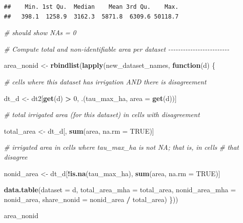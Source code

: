 \documentclass[
  11pt,
]{article}
\newenvironment{Shaded}{\begin{snugshade}}{\end{snugshade}}
\newcommand{\AttributeTok}[1]{\textcolor[rgb]{0.13,0.29,0.53}{#1}}
\newcommand{\CommentTok}[1]{\textcolor[rgb]{0.56,0.35,0.01}{\textit{#1}}}
\newcommand{\ConstantTok}[1]{\textcolor[rgb]{0.56,0.35,0.01}{#1}}
\newcommand{\ControlFlowTok}[1]{\textcolor[rgb]{0.13,0.29,0.53}{\textbf{#1}}}
\newcommand{\DecValTok}[1]{\textcolor[rgb]{0.00,0.00,0.81}{#1}}
\newcommand{\FunctionTok}[1]{\textcolor[rgb]{0.13,0.29,0.53}{\textbf{#1}}}
\newcommand{\NormalTok}[1]{#1}
\newcommand{\OtherTok}[1]{\textcolor[rgb]{0.56,0.35,0.01}{#1}}
\newcommand{\SpecialCharTok}[1]{\textcolor[rgb]{0.81,0.36,0.00}{\textbf{#1}}}
\begin{document}
\begin{verbatim}
##    Min. 1st Qu.  Median    Mean 3rd Qu.    Max. 
##   398.1  1258.9  3162.3  5871.8  6309.6 50118.7
\end{verbatim}

\begin{Shaded}
\begin{Highlighting}[]
\CommentTok{\# should show NA\textquotesingle{}s = 0}

\CommentTok{\# Compute total and non{-}identifiable area per dataset {-}{-}{-}{-}{-}{-}{-}{-}{-}{-}{-}{-}{-}{-}{-}{-}{-}{-}{-}{-}{-}{-}{-}{-}{-}}

\NormalTok{area\_nonid }\OtherTok{\textless{}{-}} \FunctionTok{rbindlist}\NormalTok{(}\FunctionTok{lapply}\NormalTok{(new\_dataset\_names, }\ControlFlowTok{function}\NormalTok{(d) \{}

  \CommentTok{\# cells where this dataset has irrigation AND there is disagreement}

\NormalTok{  dt\_d }\OtherTok{\textless{}{-}}\NormalTok{ dt2[}\FunctionTok{get}\NormalTok{(d) }\SpecialCharTok{\textgreater{}} \DecValTok{0}\NormalTok{, .(tau\_max\_ha, }\AttributeTok{area =} \FunctionTok{get}\NormalTok{(d))]}

  \CommentTok{\# total irrigated area (for this dataset) in cells with disagreement}

\NormalTok{  total\_area }\OtherTok{\textless{}{-}}\NormalTok{ dt\_d[, }\FunctionTok{sum}\NormalTok{(area, }\AttributeTok{na.rm =} \ConstantTok{TRUE}\NormalTok{)]}

  \CommentTok{\# irrigated area in cells where tau\_max\_ha is not NA; that is, in cells}
  \CommentTok{\# that disagree}

\NormalTok{  nonid\_area }\OtherTok{\textless{}{-}}\NormalTok{ dt\_d[}\SpecialCharTok{!}\FunctionTok{is.na}\NormalTok{(tau\_max\_ha), }\FunctionTok{sum}\NormalTok{(area, }\AttributeTok{na.rm =} \ConstantTok{TRUE}\NormalTok{)]}

  \FunctionTok{data.table}\NormalTok{(}\AttributeTok{dataset =}\NormalTok{ d, }\AttributeTok{total\_area\_mha =}\NormalTok{ total\_area,}
             \AttributeTok{nonid\_area\_mha =}\NormalTok{ nonid\_area, }\AttributeTok{share\_nonid =}\NormalTok{ nonid\_area }\SpecialCharTok{/}\NormalTok{ total\_area)}
\NormalTok{\}))}

\NormalTok{area\_nonid}
\end{Highlighting}
\end{Shaded}
\end{document}
